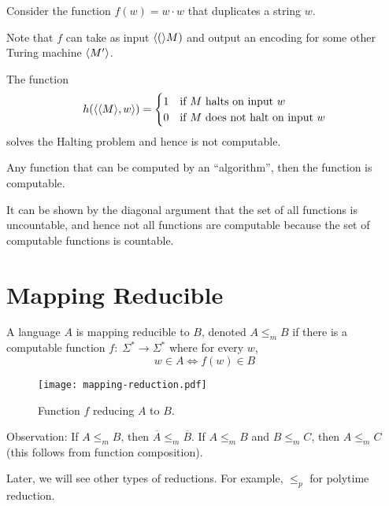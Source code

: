 \begin{example}[Duplicate]
    Consider the function
    $f(w) = w \cdot w$ 
    that duplicates a string $w$.
\end{example}

Note that $f$ can take as input $\langle ( \rangle M)$ and output an encoding for some other Turing machine $\langle M' \rangle$.

\begin{example}
    The function
    $$
    h(\langle \langle M \rangle,w \rangle) = \begin{cases}
        1 & \text{if $M$ halts on input $w$} \\
        0 & \text{if $M$ does not halt on input $w$}
    \end{cases}
    $$
    solves the Halting problem and hence is not computable.
\end{example}

\begin{theorem}
    Any function that can be computed by an ``algorithm'', then the function is computable.
\end{theorem}

It can be shown by the diagonal argument that the set of all functions is uncountable, and hence not all functions are computable because the set of computable functions is countable.

\section{Mapping Reducible}

\begin{definition}
    A language $A$  is mapping reducible to $B$, denoted $A \leq_m B$ if there is a computable function $f:\; \Sigma^* \to \Sigma^*$ where for every $w$,
    $$
    w \in A \iff f(w) \in B
    $$
\end{definition}

\begin{figure}[htbp]
    \centering
    \texttt{[image: mapping-reduction.pdf]}
    \caption{Function $f$ reducing $A$ to $B$.}
    \label{fig:mapping-reduction}
\end{figure}

Observation: If $A \leq_m B$, then $\overline{A} \leq_m \overline{B}$. If $A \leq_m B$ and $B \leq_m C$, then $A \leq_m C$ (this follows from function composition).

\begin{remark}
    Later, we will see other types of reductions. For example, $\leq_p$ for polytime reduction.
\end{remark}

